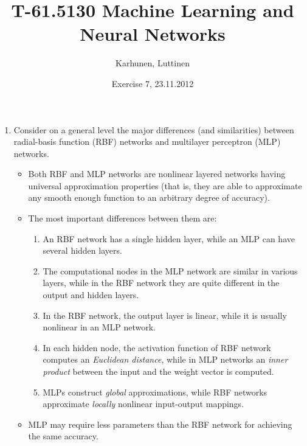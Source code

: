 
\title{T-61.5130 Machine Learning and Neural Networks}
\author{Karhunen, Luttinen}
\date{Exercise 7, 23.11.2012}

\newcommand{\vect}[1]{{\bf{#1}}}
\newcommand{\svect}[1]{\boldsymbol{#1}}
\newcommand{\matr}[1]{\boldsymbol{#1}}

\usepackage{graphicx}



\maketitle

\begin{enumerate}

\item Consider on a general level the major differences (and similarities)
  between radial-basis function (RBF) networks and multilayer perceptron
  (MLP) networks.

  \begin{solution}

    \begin{itemize}
    \item Both RBF and MLP networks are nonlinear layered networks having
      universal approximation properties (that is, they are able to
      approximate any smooth enough function to an arbitrary degree of accuracy).
    \item The most important differences between them are:
      \begin{enumerate}
      \item An RBF network has a single hidden layer, while an MLP can have
        several hidden layers.
      \item The computational nodes in the MLP network are similar in various layers,
        while in the RBF network they are quite different in the output
        and hidden layers.
      \item In the RBF network, the output layer is linear, while it is usually
        nonlinear in an MLP network.
      \item In each hidden node, the activation function of RBF network computes
        an {\em Euclidean distance}, while in MLP networks an {\em inner product}
        between the input and the weight vector is computed.
      \item MLPs construct {\em global} approximations, while RBF networks
        approximate {\em locally} nonlinear input-output mappings.
      \end{enumerate}
    \item MLP may require less parameters than the RBF network for achieving
      the same accuracy.
    \end{itemize}


\end{solution}
\end{enumerate}
